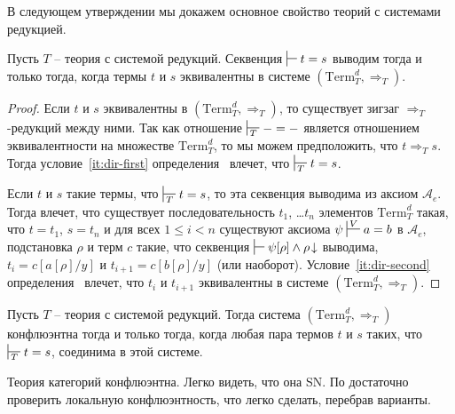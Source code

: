 \documentclass[reqno]{amsart}
\theoremstyle{definition}
\theoremstyle{remark}
\newcommand{\Term}{\mathrm{Term}}
\begin{document}
В следующем утверждении мы докажем основное свойство теорий с системами редукцией.

\begin{prop}
Пусть $T$ -- теория с системой редукций.
Секвенция $\sststile{}{} t = s$ выводим тогда и только тогда, когда термы $t$ и $s$ эквивалентны в системе $(\Term_T^d,\Rightarrow_T)$.
\end{prop}
\begin{proof}
Если $t$ и $s$ эквивалентны в $(\Term_T^d,\Rightarrow_T)$, то существует зигзаг $\Rightarrow_T$-редукций между ними.
Так как отношение $\sststile{T}{} - = -$ является отношением эквивалентности на множестве $\Term_T^d$, то мы можем предположить, что $t \Rightarrow_T s$.
Тогда условие~\eqref{it:dir-first} определения~ влечет, что $\sststile{T}{} t = s$.

Если $t$ и $s$ такие термы, что $\sststile{T}{} t = s$, то эта секвенция выводима из аксиом $\mathcal{A}_e$.
Тогда  влечет, что существует последовательность $t_1$, \ldots $t_n$ элементов $\Term^d_T$ такая, что $t = t_1$, $s = t_n$ и для всех $1 \leq i < n$
существуют аксиома $\psi \sststile{}{V} a = b$ в $\mathcal{A}_e$, подстановка $\rho$ и терм $c$ такие,
что секвенция $\sststile{}{} \psi[\rho] \land \rho\!\downarrow$ выводима, $t_i = c[a[\rho]/y]$ и $t_{i+1} = c[b[\rho]/y]$ (или наоборот).
Условие~\eqref{it:dir-second} определения~ влечет, что $t_i$ и $t_{i+1}$ эквивалентны в системе $(\Term_T^d,\Rightarrow_T)$.
\end{proof}

\begin{cor}
Пусть $T$ -- теория с системой редукций.
Тогда система $(\Term_T^d,\Rightarrow_T)$ конфлюэнтна тогда и только тогда, когда любая пара термов $t$ и $s$ таких, что $\sststile{T}{} t = s$, соединима в этой системе.
\end{cor}

\begin{example}
Теория категорий конфлюэнтна.
Легко видеть, что она SN.
По  достаточно проверить локальную конфлюэнтность, что легко сделать, перебрав варианты.
\end{example}



\end{document}
